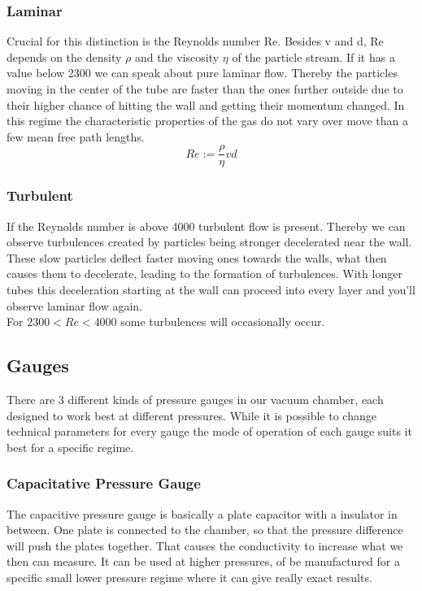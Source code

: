 \documentclass[]{article}
\begin{document}
\subsubsection{Laminar}
Crucial for this distinction is the Reynolds number Re. Besides v and d, Re depends on the density $\rho$ and the viscosity $\eta$ of the particle stream. If it has a value below 2300 we can speak about pure laminar flow. Thereby the particles moving in the center of the tube are faster than the ones further outside due to their higher chance of hitting the wall and getting their momentum changed. In this regime the characteristic properties of the gas do not vary over move than a few mean free path lengths.  
\[ Re:= \frac{\rho}{\eta} v d\]

\subsubsection{Turbulent}
If the Reynolds number is above 4000 turbulent flow is present. Thereby we can observe turbulences created by particles being stronger decelerated near the wall. These slow particles deflect faster moving ones towards the walls, what then causes them to decelerate, leading to the formation of turbulences. With longer tubes this deceleration starting at the wall can proceed into every layer and you'll observe laminar flow again. \\
For $2300 < Re < 4000$ some turbulences will occasionally occur.


\subsection{Gauges}
There are 3 different kinds of pressure gauges in our vacuum chamber, each designed to work best at different pressures. While it is possible to change technical parameters for every gauge the mode of operation of each gauge suits it best for a specific regime.

\subsubsection[Capacitive]{Capacitative Pressure Gauge}
The capacitive pressure gauge is basically a plate capacitor with a insulator in between. One plate is connected to the chamber, so that the pressure difference will push the plates together. That causes the conductivity to increase what we then can measure. It can be used at higher pressures, of be manufactured for a specific small lower pressure regime where it can give really exact results. 
\end{document}
